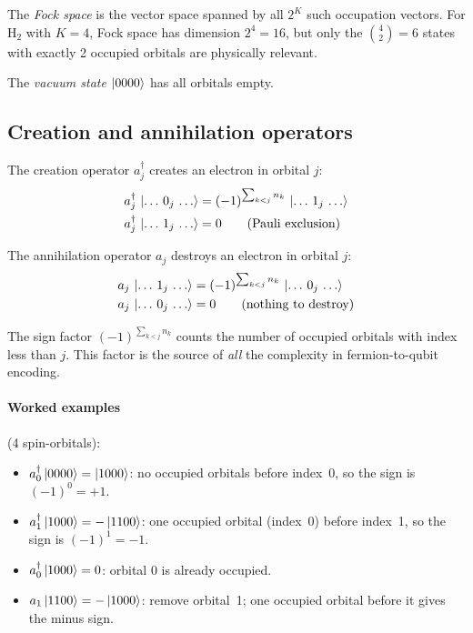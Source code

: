 \documentclass[aps,prb,preprint,longbibliography,nofootinbib]{revtex4-2}
\begin{document}
The \emph{Fock space} is the vector space spanned by all $2^K$ such
occupation vectors.  For H$_2$ with $K = 4$, Fock space has dimension
$2^4 = 16$, but only the $\binom{4}{2} = 6$ states with exactly 2
occupied orbitals are physically relevant.

The \emph{vacuum state} $\ket{0000}$ has all orbitals empty.

\subsection{Creation and annihilation operators}

The creation operator $a^\dagger_j$ creates an electron in orbital $j$:
\begin{align}
a^\dagger_j \,\ket{\ldots\, 0_j\, \ldots}
  &= (-1)^{\sum_{k<j} n_k} \,\ket{\ldots\, 1_j\, \ldots} \\
a^\dagger_j \,\ket{\ldots\, 1_j\, \ldots}
  &= 0 \qquad \text{(Pauli exclusion)}
\end{align}

The annihilation operator $a_j$ destroys an electron in orbital $j$:
\begin{align}
a_j \,\ket{\ldots\, 1_j\, \ldots}
  &= (-1)^{\sum_{k<j} n_k} \,\ket{\ldots\, 0_j\, \ldots} \\
a_j \,\ket{\ldots\, 0_j\, \ldots}
  &= 0 \qquad \text{(nothing to destroy)}
\end{align}

The sign factor $(-1)^{\sum_{k<j} n_k}$ counts the number of occupied
orbitals with index less than $j$.  This factor is the source of
\emph{all} the complexity in fermion-to-qubit encoding.

\paragraph{Worked examples} (4 spin-orbitals):

\begin{itemize}
\item $a^\dagger_0 \ket{0000} = \ket{1000}$: no occupied orbitals
  before index~0, so the sign is $(-1)^0 = +1$.

\item $a^\dagger_1 \ket{1000} = -\ket{1100}$: one occupied orbital
  (index~0) before index~1, so the sign is $(-1)^1 = -1$.

\item $a^\dagger_0 \ket{1000} = 0$: orbital 0 is already occupied.

\item $a_1 \ket{1100} = -\ket{1000}$: remove orbital~1; one occupied
  orbital before it gives the minus sign.
\end{itemize}
\end{document}
